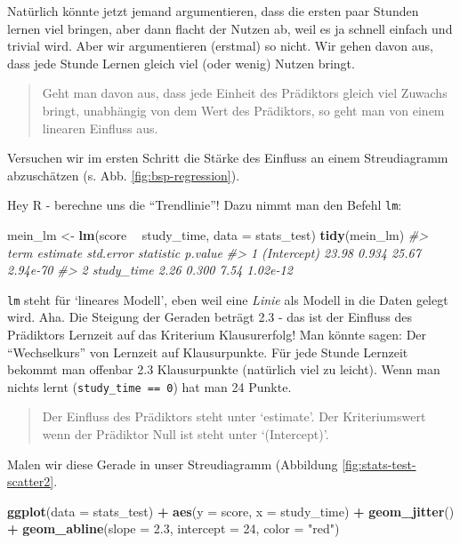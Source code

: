 \documentclass[12pt,ngerman,]{book}
\makeatletter
\newenvironment{Shaded}{\begin{snugshade}}{\end{snugshade}}
\newcommand{\KeywordTok}[1]{\textcolor[rgb]{0.13,0.29,0.53}{\textbf{#1}}}
\newcommand{\DataTypeTok}[1]{\textcolor[rgb]{0.13,0.29,0.53}{#1}}
\newcommand{\DecValTok}[1]{\textcolor[rgb]{0.00,0.00,0.81}{#1}}
\newcommand{\FloatTok}[1]{\textcolor[rgb]{0.00,0.00,0.81}{#1}}
\newcommand{\StringTok}[1]{\textcolor[rgb]{0.31,0.60,0.02}{#1}}
\newcommand{\CommentTok}[1]{\textcolor[rgb]{0.56,0.35,0.01}{\textit{#1}}}
\newcommand{\OperatorTok}[1]{\textcolor[rgb]{0.81,0.36,0.00}{\textbf{#1}}}
\newcommand{\NormalTok}[1]{#1}
\newenvironment{kframe}{%
\medskip{}
\setlength{\fboxsep}{.8em}
 \def\at@end@of@kframe{}%
 \ifinner\ifhmode%
  \def\at@end@of@kframe{\end{minipage}}%
  \begin{minipage}{\columnwidth}%
 \fi\fi%
 \def\FrameCommand##1{\hskip\@totalleftmargin \hskip-\fboxsep
 \colorbox{shadecolor}{##1}\hskip-\fboxsep
     \hskip-\linewidth \hskip-\@totalleftmargin \hskip\columnwidth}%
 \MakeFramed {\advance\hsize-\width
   \@totalleftmargin\z@ \linewidth\hsize
   \@setminipage}}%
 {\par\unskip\endMakeFramed%
 \at@end@of@kframe}
\renewenvironment{Shaded}{\begin{kframe}}{\end{kframe}}
\theoremstyle{definition}
\theoremstyle{definition}
\theoremstyle{remark}
\makeatother
\begin{document}
Natürlich könnte jetzt jemand argumentieren, dass die ersten paar
Stunden lernen viel bringen, aber dann flacht der Nutzen ab, weil es ja
schnell einfach und trivial wird. Aber wir argumentieren (erstmal) so
nicht. Wir gehen davon aus, dass jede Stunde Lernen gleich viel (oder
wenig) Nutzen bringt.

\begin{quote}
Geht man davon aus, dass jede Einheit des Prädiktors gleich viel Zuwachs
bringt, unabhängig von dem Wert des Prädiktors, so geht man von einem
linearen Einfluss aus.
\end{quote}

Versuchen wir im ersten Schritt die Stärke des Einfluss an einem
Streudiagramm abzuschätzen (s. Abb. \ref{fig:bsp-regression}).

Hey R - berechne uns die ``Trendlinie''! Dazu nimmt man den Befehl
\texttt{lm}:

\begin{Shaded}
\begin{Highlighting}[]
\NormalTok{mein_lm <-}\StringTok{ }\KeywordTok{lm}\NormalTok{(score }\OperatorTok{~}\StringTok{ }\NormalTok{study_time, }\DataTypeTok{data =}\NormalTok{ stats_test)}
\KeywordTok{tidy}\NormalTok{(mein_lm)}
\CommentTok{#>          term estimate std.error statistic  p.value}
\CommentTok{#> 1 (Intercept)    23.98     0.934     25.67 2.94e-70}
\CommentTok{#> 2  study_time     2.26     0.300      7.54 1.02e-12}
\end{Highlighting}
\end{Shaded}

\texttt{lm} steht für `lineares Modell', eben weil eine \emph{Linie} als
Modell in die Daten gelegt wird. Aha. Die Steigung der Geraden beträgt
2.3 - das ist der Einfluss des Prädiktors Lernzeit auf das Kriterium
Klausurerfolg! Man könnte sagen: Der ``Wechselkurs'' von Lernzeit auf
Klausurpunkte. Für jede Stunde Lernzeit bekommt man offenbar 2.3
Klausurpunkte (natürlich viel zu leicht). Wenn man nichts lernt
(\texttt{study\_time\ ==\ 0}) hat man 24 Punkte.

\begin{quote}
Der Einfluss des Prädiktors steht unter `estimate'. Der Kriteriumswert
wenn der Prädiktor Null ist steht unter `(Intercept)'.
\end{quote}

Malen wir diese Gerade in unser Streudiagramm (Abbildung
\ref{fig:stats-test-scatter2}.

\begin{Shaded}
\begin{Highlighting}[]
\KeywordTok{ggplot}\NormalTok{(}\DataTypeTok{data =}\NormalTok{ stats_test) }\OperatorTok{+}
\StringTok{  }\KeywordTok{aes}\NormalTok{(}\DataTypeTok{y =}\NormalTok{ score, }\DataTypeTok{x =}\NormalTok{ study_time) }\OperatorTok{+}
\StringTok{  }\KeywordTok{geom_jitter}\NormalTok{() }\OperatorTok{+}
\StringTok{  }\KeywordTok{geom_abline}\NormalTok{(}\DataTypeTok{slope =} \FloatTok{2.3}\NormalTok{, }\DataTypeTok{intercept =} \DecValTok{24}\NormalTok{, }\DataTypeTok{color =} \StringTok{"red"}\NormalTok{)}
\end{Highlighting}
\end{Shaded}
\end{document}
